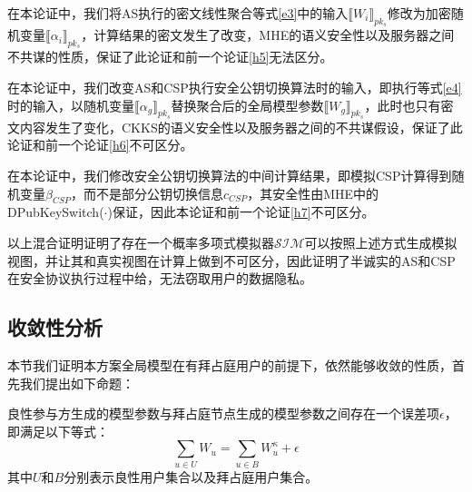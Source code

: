 \begin{hybrid}\label{h6}
	在本论证中，我们将AS执行的密文线性聚合等式\ref{e3}中的输入$\llbracket W_i\rrbracket_{pk_s}$修改为加密随机变量$\llbracket \alpha_i\rrbracket_{pk_s}$，计算结果的密文发生了改变，MHE的语义安全性以及服务器之间不共谋的性质，保证了此论证和前一个论证\ref{h5}无法区分。
\end{hybrid}

\begin{hybrid}\label{h7}
	在本论证中，我们改变AS和CSP执行安全公钥切换算法时的输入，即执行等式\ref{e4}时的输入，以随机变量$\llbracket \alpha_g\rrbracket_{pk_s}$替换聚合后的全局模型参数$\llbracket W_g\rrbracket_{pk_s}$，此时也只有密文内容发生了变化，CKKS的语义安全性以及服务器之间的不共谋假设，保证了此论证和前一个论证\ref{h6}不可区分。
\end{hybrid}

\begin{hybrid}\label{h8}
	在本论证中，我们修改安全公钥切换算法的中间计算结果，即模拟CSP计算得到随机变量$\beta_{CSP}$，而不是部分公钥切换信息$c_{CSP}$，其安全性由MHE中的DPubKeySwitch($\cdot$)保证，因此本论证和前一个论证\ref{h7}不可区分。
\end{hybrid}

以上混合证明证明了存在一个概率多项式模拟器$ \mathcal{SIM} $可以按照上述方式生成模拟视图，并让其和真实视图在计算上做到不可区分，因此证明了半诚实的AS和CSP在安全协议执行过程中给，无法窃取用户的数据隐私。


\subsection{收敛性分析}
本节我们证明本方案全局模型在有拜占庭用户的前提下，依然能够收敛的性质，首先我们提出如下命题：
\begin{proposition}[误差项]\label{pro2}
	良性参与方生成的模型参数与拜占庭节点生成的模型参数之间存在一个误差项$\epsilon$，即满足以下等式：
	$$
		\sum_{u\in U}W_u=   \sum_{u\in B}W_u^{\kappa} + \epsilon	
	$$
	其中$U$和$ B $分别表示良性用户集合以及拜占庭用户集合。
\end{proposition}


